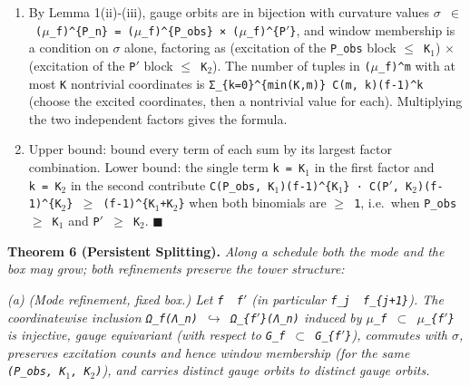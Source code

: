 \documentclass[
  american,
  11pt,
  letterpaper,
]{article}
\begin{document}
\begin{enumerate}
\def\labelenumi{(\alph{enumi})}
\setcounter{enumi}{1}
\item
  By Lemma 1(ii)-(iii), gauge orbits are in bijection with curvature values \texttt{\ensuremath{\sigma}\ \ensuremath{\in}\ (\ensuremath{\mu}\_f)\^{}\{P\_n\}\ =\ (\ensuremath{\mu}\_f)\^{}\{P\_obs\}\ ×\ (\ensuremath{\mu}\_f)\^{}\{P\ensuremath{'}\}}, and window membership is a condition on \texttt{\ensuremath{\sigma}} alone, factoring as (excitation of the \texttt{P\_obs} block \texttt{\ensuremath{\leq}\ K\ensuremath{{}_{1}}}) × (excitation of the \texttt{P\ensuremath{'}} block \texttt{\ensuremath{\leq}\ K\ensuremath{{}_{2}}}). The number of tuples in \texttt{(\ensuremath{\mu}\_f)\^{}m} with at most \texttt{K} nontrivial coordinates is \texttt{Σ\_\{k=0\}\^{}\{min(K,m)\}\ C(m,\ k)(f-1)\^{}k} (choose the excited coordinates, then a nontrivial value for each). Multiplying the two independent factors gives the formula.
\item
  Upper bound: bound every term of each sum by its largest factor combination. Lower bound: the single term \texttt{k\ =\ K\ensuremath{{}_{1}}} in the first factor and \texttt{k\ =\ K\ensuremath{{}_{2}}} in the second contribute \texttt{C(\textbar{}P\_obs\textbar{},\ K\ensuremath{{}_{1}})(f-1)\^{}\{K\ensuremath{{}_{1}}\}\ ·\ C(\textbar{}P\ensuremath{'}\textbar{},\ K\ensuremath{{}_{2}})(f-1)\^{}\{K\ensuremath{{}_{2}}\}\ \ensuremath{\geq}\ (f-1)\^{}\{K\ensuremath{{}_{1}}+K\ensuremath{{}_{2}}\}} when both binomials are \texttt{\ensuremath{\geq}\ 1}, i.e.~when \texttt{\textbar{}P\_obs\textbar{}\ \ensuremath{\geq}\ K\ensuremath{{}_{1}}} and \texttt{\textbar{}P\ensuremath{'}\textbar{}\ \ensuremath{\geq}\ K\ensuremath{{}_{2}}}. \ensuremath{\blacksquare}
\end{enumerate}

\textbf{Theorem 6 (Persistent Splitting).} \emph{Along a schedule both the mode and the box may grow; both refinements preserve the tower structure:}

\emph{(a) (Mode refinement, fixed box.) Let \texttt{f\ \textbar{}\ f\ensuremath{'}} (in particular \texttt{f\_j\ \textbar{}\ f\_\{j+1\}}). The coordinatewise inclusion \texttt{Ω\_f(Λ\_n)\ \ensuremath{\hookrightarrow}\ Ω\_\{f\ensuremath{'}\}(Λ\_n)} induced by \texttt{\ensuremath{\mu}\_f\ \ensuremath{\subset}\ \ensuremath{\mu}\_\{f\ensuremath{'}\}} is injective, gauge equivariant (with respect to \texttt{G\_f\ \ensuremath{\subset}\ G\_\{f\ensuremath{'}\}}), commutes with \texttt{\ensuremath{\sigma}}, preserves excitation counts and hence window membership (for the same \texttt{(P\_obs,\ K\ensuremath{{}_{1}},\ K\ensuremath{{}_{2}})}), and carries distinct gauge orbits to distinct gauge orbits.}
\end{document}
